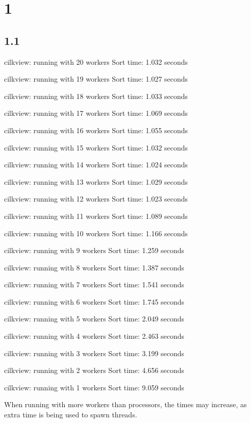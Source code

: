 \documentclass[12pt]{article}
\begin{document}
\maketitle
\section{1}
\subsection{1.1}
cilkview: running with 20 workers
Sort time: 1.032 seconds

cilkview: running with 19 workers
Sort time: 1.027 seconds

cilkview: running with 18 workers
Sort time: 1.033 seconds

cilkview: running with 17 workers
Sort time: 1.069 seconds

cilkview: running with 16 workers
Sort time: 1.055 seconds

cilkview: running with 15 workers
Sort time: 1.032 seconds

cilkview: running with 14 workers
Sort time: 1.024 seconds

cilkview: running with 13 workers
Sort time: 1.029 seconds

cilkview: running with 12 workers
Sort time: 1.023 seconds

cilkview: running with 11 workers
Sort time: 1.089 seconds

cilkview: running with 10 workers
Sort time: 1.166 seconds

cilkview: running with 9 workers
Sort time: 1.259 seconds

cilkview: running with 8 workers
Sort time: 1.387 seconds

cilkview: running with 7 workers
Sort time: 1.541 seconds

cilkview: running with 6 workers
Sort time: 1.745 seconds

cilkview: running with 5 workers
Sort time: 2.049 seconds

cilkview: running with 4 workers
Sort time: 2.463 seconds

cilkview: running with 3 workers
Sort time: 3.199 seconds

cilkview: running with 2 workers
Sort time: 4.656 seconds

cilkview: running with 1 workers
Sort time: 9.059 seconds

When running with more workers than processors, the times may increase, as extra 
time is being used to spawn threads.
\end{document}
